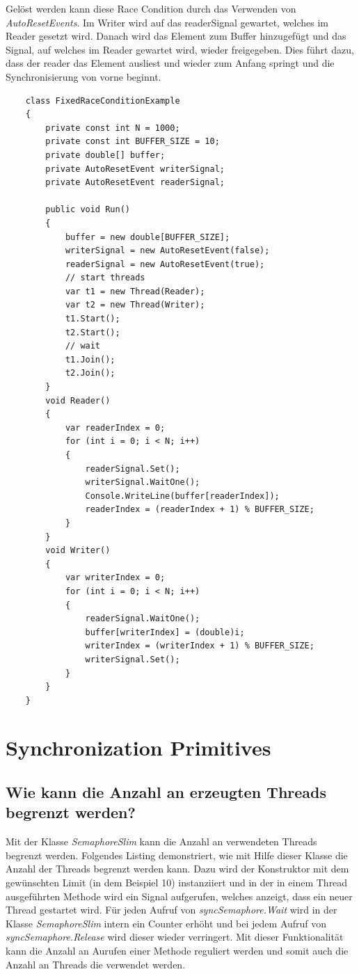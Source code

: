\documentclass[a4paper,ngerman]{scrartcl}
\begin{document}
Gelöst werden kann diese Race Condition durch das Verwenden von \textit{AutoResetEvents}.
Im Writer wird auf das readerSignal gewartet, welches im Reader gesetzt wird. Danach wird 
das Element zum Buffer hinzugefügt und das Signal, auf welches im Reader gewartet wird, 
wieder freigegeben. Dies führt dazu, dass der reader das Element ausliest und wieder zum
Anfang springt und die Synchronisierung von vorne beginnt.

\begin{lstlisting}
    class FixedRaceConditionExample
    {
        private const int N = 1000;
        private const int BUFFER_SIZE = 10;
        private double[] buffer;
        private AutoResetEvent writerSignal;
        private AutoResetEvent readerSignal;

        public void Run()
        {
            buffer = new double[BUFFER_SIZE];
            writerSignal = new AutoResetEvent(false);
            readerSignal = new AutoResetEvent(true);
            // start threads
            var t1 = new Thread(Reader);
            var t2 = new Thread(Writer);
            t1.Start();
            t2.Start();
            // wait
            t1.Join();
            t2.Join();
        }
        void Reader()
        {
            var readerIndex = 0;
            for (int i = 0; i < N; i++)
            {
                readerSignal.Set();
                writerSignal.WaitOne();
                Console.WriteLine(buffer[readerIndex]);
                readerIndex = (readerIndex + 1) % BUFFER_SIZE;
            }
        }
        void Writer()
        {
            var writerIndex = 0;
            for (int i = 0; i < N; i++)
            {
                readerSignal.WaitOne();
                buffer[writerIndex] = (double)i;
                writerIndex = (writerIndex + 1) % BUFFER_SIZE;
                writerSignal.Set();
            }
        }
    }
\end{lstlisting}


\section{Synchronization Primitives}
\subsection{Wie kann die Anzahl an erzeugten Threads begrenzt werden?}
Mit der Klasse \textit{SemaphoreSlim} kann die Anzahl an verwendeten Threads begrenzt werden. Folgendes Listing
demonstriert, wie mit Hilfe dieser Klasse die Anzahl der Threads begrenzt werden kann. Dazu wird der Konstruktor
mit dem gewünschten Limit (in dem Beispiel 10) instanziiert und in der in einem Thread ausgeführten Methode wird 
ein Signal aufgerufen, welches anzeigt, dass ein neuer Thread gestartet wird. Für jeden Aufruf von \textit{syncSemaphore.Wait}
wird in der Klasse \textit{SemaphoreSlim} intern ein Counter erhöht und bei jedem Aufruf von \textit{syncSemaphore.Release}
wird dieser wieder verringert. Mit dieser Funktionalität kann die Anzahl an Aurufen einer Methode reguliert werden und somit
auch die Anzahl an Threads die verwendet werden.
\end{document}
